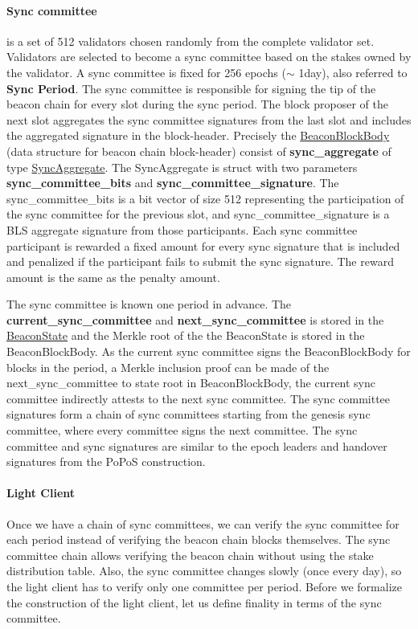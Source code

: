 \paragraph{Sync committee} is a set of 512 validators chosen randomly from the complete validator set. 
Validators are selected to become a sync committee based on the stakes owned by the validator. 
A sync committee is fixed for 256 epochs ($\sim$ 1day), also referred to \textbf{Sync Period}. 
The sync committee is responsible for signing the tip of the beacon chain for every slot during the sync period. 
The block proposer of the next slot aggregates the sync committee signatures from the last slot and includes the aggregated signature in the block-header. 
Precisely the \href{https://github.com/ethereum/consensus-specs/blob/dev/specs/altair/beacon-chain.md#beaconblockbody}{BeaconBlockBody} (data structure for beacon chain block-header) consist of \textbf{sync\_aggregate} of type \href{https://github.com/ethereum/consensus-specs/blob/dev/specs/altair/beacon-chain.md#syncaggregate}{SyncAggregate}. 
The SyncAggregate is struct with two parameters \textbf{sync\_committee\_bits} and \textbf{sync\_committee\_signature}. 
The sync\_committee\_bits is a bit vector of size 512 representing the participation of the sync committee for the previous slot, and sync\_committee\_signature is a BLS aggregate signature from those participants. 
Each sync committee participant is rewarded a fixed amount for every sync signature that is included and penalized if the participant fails to submit the sync signature. 
The reward amount is the same as the penalty amount. 
  
The sync committee is known one period in advance. 
The \textbf{current\_sync\_committee} and \textbf{next\_sync\_committee} is stored in the \href{https://github.com/ethereum/consensus-specs/blob/dev/specs/altair/beacon-chain.md#beaconstate}{BeaconState} and the Merkle root of the the BeaconState is stored in the BeaconBlockBody. 
As the current sync committee signs the BeaconBlockBody for blocks in the period, a Merkle inclusion proof can be made of the next\_sync\_committee to state root in BeaconBlockBody, the current sync committee indirectly attests to the next sync committee. 
The sync committee signatures form a chain of sync committees starting from the genesis sync committee, where every committee signs the next committee. 
The sync committee and sync signatures are similar to the epoch leaders and handover signatures from the PoPoS construction.   
   
\paragraph{Light Client}
Once we have a chain of sync committees, we can verify the sync committee for each period instead of verifying the beacon chain blocks themselves. 
The sync committee chain allows verifying the beacon chain without using the stake distribution table. 
Also, the sync committee changes slowly (once every day), so the light client has to verify only one committee per period.
Before we formalize the construction of the light client, let us define finality in terms of the sync committee. 

